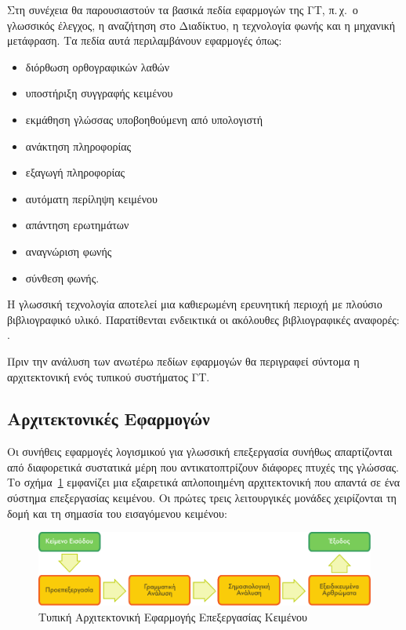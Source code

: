 \begin{multicols}{2}
Στη συνέχεια θα παρουσιαστούν τα βασικά πεδία εφαρμογών της ΓΤ, π.\,χ.~ο γλωσσικός έλεγχος, η αναζήτηση στο Διαδίκτυο, η τεχνολογία φωνής και η μηχανική μετάφραση. Τα πεδία αυτά περιλαμβάνουν εφαρμογές όπως:

\begin{itemize}
\item διόρθωση ορθογραφικών λαθών
\item υποστήριξη συγγραφής κειμένου
\item εκμάθηση γλώσσας υποβοηθούμενη από υπολογιστή
\item ανάκτηση πληροφορίας
\item εξαγωγή πληροφορίας
\item αυτόματη περίληψη κειμένου
\item απάντηση ερωτημάτων
\item αναγνώριση φωνής 
\item σύνθεση φωνής.
\end{itemize}

Η γλωσσική τεχνολογία αποτελεί μια καθιερωμένη ερευνητική περιοχή με πλούσιο βιβλιογραφικό υλικό. Παρατίθενται ενδεικτικά οι ακόλουθες βιβλιογραφικές αναφορές: \cite{jurafsky-martin01, manning-schuetze1, lt-world1, lt-survey1}.

Πριν την ανάλυση των ανωτέρω πεδίων εφαρμογών θα περιγραφεί σύντομα η αρχιτεκτονική ενός τυπικού συστήματος ΓΤ. 

\subsection{Αρχιτεκτονικές Εφαρμογών}

Οι συνήθεις εφαρμογές λογισμικού για γλωσσική επεξεργασία συνήθως απαρτίζονται από διαφορετικά συστατικά μέρη που αντικατοπτρίζουν διάφορες πτυχές της γλώσσας. Το σχήμα~\ref{fig:textprocessingarch_de} εμφανίζει μια εξαιρετικά απλοποιημένη αρχιτεκτονική που απαντά σε ένα σύστημα επεξεργασίας κειμένου. Οι πρώτες τρεις λειτουργικές μονάδες χειρίζονται τη δομή και τη σημασία του εισαγόμενου κειμένου:

\begin{figure}[b]
  \center
  \includegraphics[width=\textwidth]{../_media/greek/text_processing_app_architecture}
  \caption{Τυπική Αρχιτεκτονική Εφαρμογής Επεξεργασίας Κειμένου}
  \label{fig:textprocessingarch_de}
\end{figure}


\end{multicols}
